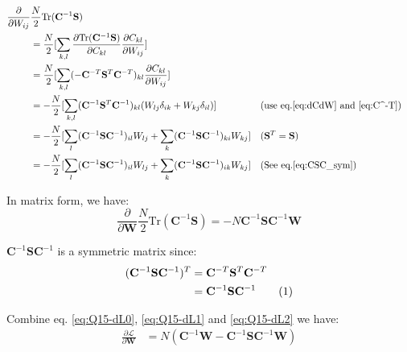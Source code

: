 \documentclass[12pt]{article}
\newenvironment{question}[2][Question]{\begin{trivlist}
\kern10pt
\item[\hskip \labelsep {\bfseries #1}\hskip \labelsep {\bfseries #2.}]}{\end{trivlist}}
\newcommand\numberthis{\addtocounter{equation}{1}\tag{\theequation}}
\begin{document}
\begin{question}{15}
\begin{align*}
  \frac{\partial}{\partial W_{ij}}&\frac{N}{2}\text{Tr}(\mathbf{C}^{-1}\mathbf{S}) \\
  &= \frac{N}{2}[\sum_{k,l} \frac{\partial \text{Tr}(\mathbf{C}^{-1}\mathbf{S})}{\partial C_{kl}}
                            \frac{\partial C_{kl}}{\partial W_{ij}} ]\\
  &= \frac{N}{2}[\sum_{k,l} (-\mathbf{C}^{-T}\mathbf{S}^{T}\mathbf{C}^{-T})_{kl}
                            \frac{\partial C_{kl}}{\partial W_{ij}} ]\\
  &= -\frac{N}{2}[\sum_{k,l} (\mathbf{C}^{-1}\mathbf{S}^{T}\mathbf{C}^{-1})_{kl}
                            (W_{lj}\delta_{ik} + W_{kj}\delta_{il}) ]       
      &&(\text{use eq.\eqref{eq:dCdW} and \eqref{eq:C^-T}})  \\
  &= -\frac{N}{2}[\sum_{l} (\mathbf{C}^{-1}\mathbf{S}\mathbf{C}^{-1})_{il}W_{lj}
                + \sum_{k} (\mathbf{C}^{-1}\mathbf{S}\mathbf{C}^{-1})_{ki}W_{kj}] 
      &&(\mathbf{S}^T = \mathbf{S})  \\
  &= -\frac{N}{2}[\sum_{l} (\mathbf{C}^{-1}\mathbf{S}\mathbf{C}^{-1})_{il}W_{lj}
                + \sum_{k} (\mathbf{C}^{-1}\mathbf{S}\mathbf{C}^{-1})_{ik}W_{kj}]
      &&(\text{See eq.}\eqref{eq:CSC_sym})  \\
\end{align*}

In matrix form, we have:
\begin{equation}
  \frac{\partial}{\partial \mathbf{W}}\frac{N}{2}\text{Tr}(\mathbf{C}^{-1}\mathbf{S})
  = -N\mathbf{C}^{-1}\mathbf{S}\mathbf{C}^{-1}\mathbf{W}
  \label{eq:Q15-dL2}
\end{equation}

$\mathbf{C}^{-1}\mathbf{S}\mathbf{C}^{-1}$ is a symmetric matrix since:
\begin{align*}
  (\mathbf{C}^{-1}\mathbf{S}\mathbf{C}^{-1})^{T} 
  &= \mathbf{C}^{-T}\mathbf{S}^T\mathbf{C}^{-T} \\
  &= \mathbf{C}^{-1}\mathbf{S}\mathbf{C}^{-1}
  \numberthis \label{eq:CSC_sym}
\end{align*}


Combine eq. \eqref{eq:Q15-dL0}, \eqref{eq:Q15-dL1} and \eqref{eq:Q15-dL2} we have:
\begin{align*}
  \frac{\partial{\mathcal{L}}}{\partial{\mathbf{W}}} 
    &= N(\mathbf{C}^{-1}\mathbf{W} 
         - \mathbf{C}^{-1}\mathbf{S}\mathbf{C}^{-1}\mathbf{W})
\end{align*}
\end{question}
\end{document}
